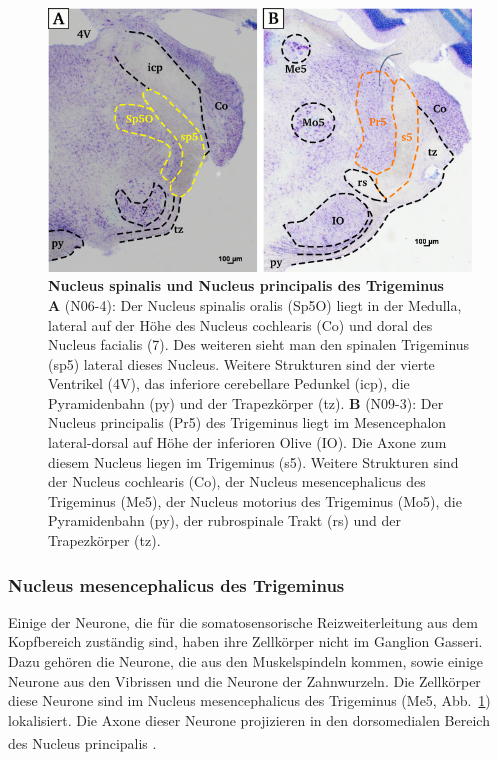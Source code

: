 \documentclass[12pt,a4paper,pdftex]{article}
\begin{document}
\begin{figure}[H]
    \centering
    \includegraphics[width = \textwidth]
    {pictures/somatosensory/somato_kopf.png}
    \caption[Nucleus spinalis und Nucleus principalis des Trigeminus]{\textbf{Nucleus spinalis und Nucleus principalis des Trigeminus}\\
     \textbf{A} (N06-4): Der Nucleus spinalis oralis (Sp5O) liegt in der Medulla, lateral auf der Höhe des Nucleus cochlearis (Co) und doral des Nucleus facialis (7). Des weiteren sieht man den spinalen Trigeminus (sp5) lateral dieses Nucleus. Weitere Strukturen sind der vierte Ventrikel (4V), das inferiore cerebellare Pedunkel (icp), die Pyramidenbahn (py) und der Trapezkörper (tz).
     \textbf{B} (N09-3): Der Nucleus principalis (Pr5) des Trigeminus liegt im Mesencephalon lateral-dorsal auf Höhe der inferioren Olive (IO). Die Axone zum diesem Nucleus liegen im Trigeminus (s5). Weitere Strukturen sind der Nucleus cochlearis (Co), der Nucleus mesencephalicus des Trigeminus (Me5), der Nucleus motorius des Trigeminus (Mo5),  die Pyramidenbahn (py), der rubrospinale Trakt (rs) und der Trapezkörper (tz).}
    \label{fig:somato_Pr5}
\end{figure}

\subsubsection*{Nucleus mesencephalicus des Trigeminus}
Einige der Neurone, die für die somatosensorische Reizweiterleitung aus dem Kopfbereich zuständig sind, haben ihre Zellkörper nicht im Ganglion Gasseri. Dazu gehören die Neurone, die aus den Muskelspindeln kommen, sowie einige Neurone aus den Vibrissen und die Neurone der Zahnwurzeln. Die Zellkörper diese Neurone sind im Nucleus mesencephalicus des Trigeminus (Me5, Abb.~\ref{fig:somato_Pr5}) lokalisiert. Die Axone dieser Neurone projizieren in den dorsomedialen Bereich des Nucleus principalis  \textsuperscript{\cite[5]{heldmaier2003tierphysiologie}}.
\end{document}
